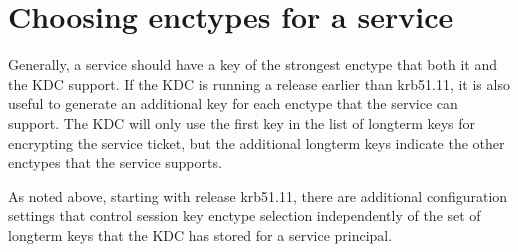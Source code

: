 \documentclass[letterpaper,10pt,english]{sphinxmanual}
\begin{document}
\section{Choosing enctypes for a service}
\label{\detokenize{admin/enctypes:choosing-enctypes-for-a-service}}
\sphinxAtStartPar
Generally, a service should have a key of the strongest
enctype that both it and the KDC support.  If the KDC is running a
release earlier than krb5\sphinxhyphen{}1.11, it is also useful to generate an
additional key for each enctype that the service can support.  The KDC
will only use the first key in the list of long\sphinxhyphen{}term keys for encrypting
the service ticket, but the additional long\sphinxhyphen{}term keys indicate the
other enctypes that the service supports.

\sphinxAtStartPar
As noted above, starting with release krb5\sphinxhyphen{}1.11, there are additional
configuration settings that control session key enctype selection
independently of the set of long\sphinxhyphen{}term keys that the KDC has stored for
a service principal.
\end{document}
